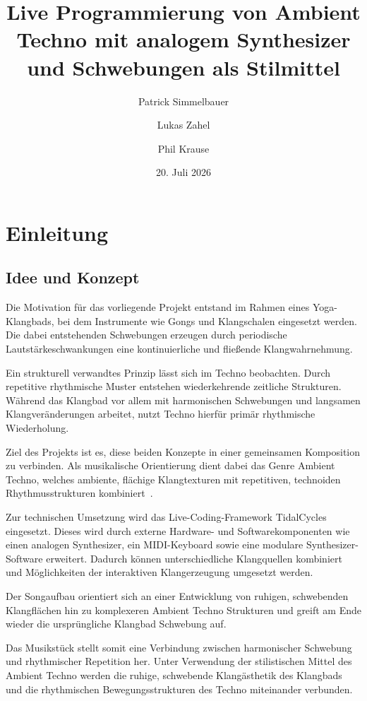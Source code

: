 \documentclass[11pt]{article}
\title{Live Programmierung von Ambient Techno mit analogem Synthesizer und Schwebungen als Stilmittel}
\author{Patrick Simmelbauer \and Lukas Zahel \and Phil Krause}
\date{20. Juli 2026}
\begin{document}
\maketitle

\section{Einleitung}

\subsection{Idee und Konzept}

Die Motivation für das vorliegende Projekt entstand im Rahmen eines Yoga-Klangbads, bei dem Instrumente wie Gongs und Klangschalen eingesetzt werden. Die dabei entstehenden Schwebungen erzeugen durch periodische Lautstärkeschwankungen eine kontinuierliche und fließende Klangwahrnehmung.

Ein strukturell verwandtes Prinzip lässt sich im Techno beobachten. Durch repetitive rhythmische Muster entstehen wiederkehrende zeitliche Strukturen. Während das Klangbad vor allem mit harmonischen Schwebungen und langsamen Klangveränderungen arbeitet, nutzt Techno hierfür primär rhythmische Wiederholung.

Ziel des Projekts ist es, diese beiden Konzepte in einer gemeinsamen Komposition zu verbinden. Als musikalische Orientierung dient dabei das Genre Ambient Techno, welches ambiente, flächige Klangtexturen mit repetitiven, technoiden Rhythmusstrukturen kombiniert~\cite{AllMusicAmbientTechno}.

Zur technischen Umsetzung wird das Live-Coding-Framework TidalCycles~\cite{mclean2010tidal} eingesetzt. Dieses wird durch externe Hardware- und Softwarekomponenten wie einen analogen Synthesizer, ein MIDI-Keyboard sowie eine modulare Synthesizer-Software erweitert. Dadurch können unterschiedliche Klangquellen kombiniert und Möglichkeiten der interaktiven Klangerzeugung umgesetzt werden.

Der Songaufbau orientiert sich an einer Entwicklung von ruhigen, schwebenden Klangflächen hin zu komplexeren Ambient Techno Strukturen und greift am Ende wieder die ursprüngliche Klangbad Schwebung auf.

Das Musikstück stellt somit eine Verbindung zwischen harmonischer Schwebung und rhythmischer Repetition her. Unter Verwendung der stilistischen Mittel des Ambient Techno werden die ruhige, schwebende Klangästhetik des Klangbads und die rhythmischen Bewegungsstrukturen des Techno miteinander verbunden.
\end{document}
